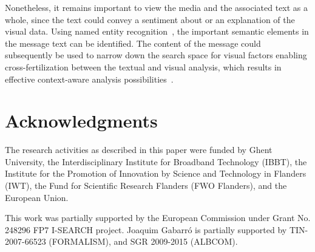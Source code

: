 \documentclass{acm_proc_article-sp}
\let\oldemph\emph
\renewcommand{\emph}[1]{\oldemph{\fontsize{9}{9}\selectfont #1}}
\newcommand{\inlinelistingsize}{\fontsize{8pt}{11pt}}
\let\oldttdefault\ttdefault
\renewcommand{\ttdefault}{pcr}
\let\oldurl\url
\renewcommand{\url}[1]{\inlinelistingsize\oldurl{#1}}
\begin{document}

Nonetheless, it remains important to view the media and the associated text as a whole, since the text could convey a sentiment about or an explanation of the visual data. Using named entity recognition~\cite{NERD,AddingMeaningToMicroposts}, the important semantic elements in the message text can be identified. The content of the message could subsequently be used to narrow down the search space for visual factors enabling cross-fertilization between the textual and visual analysis, which results in effective context-aware analysis possibilities~\cite{verborgh_mtap_2011}.


\section*{Acknowledgments}
The research activities as described in this paper were funded by Ghent University, the Interdisciplinary Institute for Broadband Technology (IBBT), the Institute for the Promotion of Innovation by Science and Technology in Flanders (IWT), the Fund for Scientific Research Flanders (FWO Flanders), and the European Union.

This work was partially supported by the European Commission under Grant No. 248296 FP7 \mbox{I-SEARCH} project.
Joaquim Gabarr\'o is partially supported by TIN-2007-66523 (FORMALISM), and SGR 2009-2015 (\mbox{ALBCOM}).


\let\ttdefault\oldttdefault
\let\url\oldurl




\balancecolumns
\end{document}
